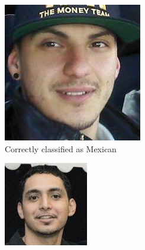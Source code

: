 \begin{figure}
    \centering
    \begin{subfigure}[b]{0.3\textwidth}
      \includegraphics[width=\textwidth]{figures/results/misclassification/mexico-mexico.jpg}
      \caption{Correctly classified as Mexican}
    \end{subfigure}
    \begin{subfigure}[b]{0.3\textwidth}
      \includegraphics[width=\textwidth]{figures/results/misclassification/mexico-india.jpg}

\end{subfigure}
\end{figure}
